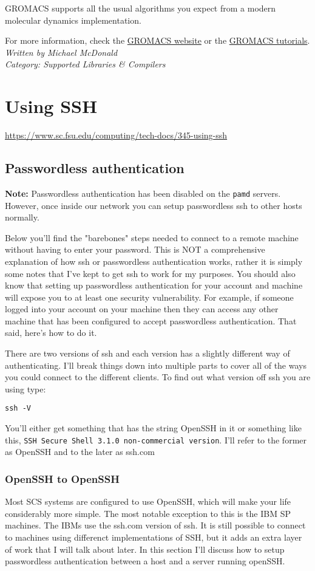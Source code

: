 \documentclass[12pt,a4paper]{article}
\begin{document}
GROMACS supports all the usual algorithms you expect from a modern molecular dynamics implementation.

For more information, check the \href{http://www.gromacs.org/}{GROMACS website} or the \href{http://www.gromacs.org/Documentation/Tutorials}{GROMACS tutorials}.
\hfill \textit{Written by Michael McDonald} \\
\hfill \textit{Category: Supported Libraries \& Compilers}

\section{Using SSH}
\url{https://www.sc.fsu.edu/computing/tech-docs/345-using-ssh}

\subsection*{Passwordless authentication}
\textbf{Note:} Passwordless authentication has been disabled on the \texttt{pamd} servers. However, once inside our network you can setup passwordless ssh to other hosts normally.

Below you'll find the "barebones" steps needed to connect to a remote machine without having to enter your password. This is NOT a comprehensive explanation of how ssh or passwordless authentication works, rather it is simply some notes that I've kept to get ssh to work for my purposes. You should also know that setting up passwordless authentication for your account and machine will expose you to at least one security vulnerability. For example, if someone logged into your account on your machine then they can access any other machine that has been configured to accept passwordless authentication. That said, here's how to do it.

There are two versions of ssh and each version has a slightly
different way of authenticating. I'll break things down into multiple
parts to cover all of the ways you could connect to the different
clients. To find out what version off ssh you are using type:
\begin{verbatim}
ssh -V
\end{verbatim}
You'll either get something that has the string OpenSSH in it or something like this, \texttt{SSH Secure Shell 3.1.0 non-commercial version}. I'll refer to the former as OpenSSH and to the later as ssh.com

\subsubsection*{OpenSSH to OpenSSH}
Most SCS systems are configured to use OpenSSH, which will make your life considerably more simple. The most notable exception to this is the IBM SP machines. The IBMs use the ssh.com version of ssh. It is still possible to connect to machines using differenct implementations of SSH, but it adds an extra layer of work that I will talk about later. In this section I'll discuss how to setup passwordless authentication between a host and a server running openSSH.
\end{document}
